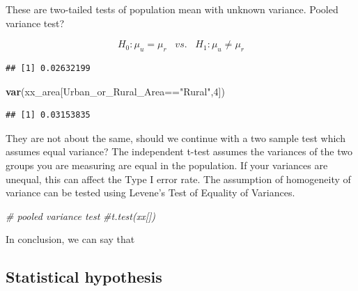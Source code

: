 \documentclass[]{article}
\newenvironment{Shaded}{\begin{snugshade}}{\end{snugshade}}
\newcommand{\KeywordTok}[1]{\textcolor[rgb]{0.13,0.29,0.53}{\textbf{{#1}}}}
\newcommand{\DecValTok}[1]{\textcolor[rgb]{0.00,0.00,0.81}{{#1}}}
\newcommand{\StringTok}[1]{\textcolor[rgb]{0.31,0.60,0.02}{{#1}}}
\newcommand{\CommentTok}[1]{\textcolor[rgb]{0.56,0.35,0.01}{\textit{{#1}}}}
\newcommand{\NormalTok}[1]{{#1}}
\begin{document}
These are two-tailed tests of population mean with unknown variance.
Pooled variance test?

\[H_{0}: \mu_{u} = \mu_{r}\;\;\;vs.\;\;\;H_{1}: \mu_{u} \neq \mu_{r}\]

\begin{Shaded}
\end{Shaded}

\begin{verbatim}
## [1] 0.02632199
\end{verbatim}

\begin{Shaded}
\begin{Highlighting}[]
\KeywordTok{var}\NormalTok{(xx_area[Urban_or_Rural_Area==}\StringTok{"Rural"}\NormalTok{,}\DecValTok{4}\NormalTok{])}
\end{Highlighting}
\end{Shaded}

\begin{verbatim}
## [1] 0.03153835
\end{verbatim}

They are not about the same, should we continue with a two sample test
which assumes equal variance? The independent t-test assumes the
variances of the two groups you are measuring are equal in the
population. If your variances are unequal, this can affect the Type I
error rate. The assumption of homogeneity of variance can be tested
using Levene's Test of Equality of Variances.

\begin{Shaded}
\begin{Highlighting}[]
\CommentTok{# pooled variance test}
\CommentTok{#t.test(xx[])}
\end{Highlighting}
\end{Shaded}

In conclusion, we can say that

\subsection{Statistical hypothesis}\label{statistical-hypothesis}
\end{document}
